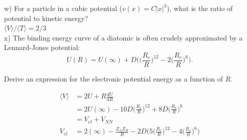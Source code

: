 \documentclass{article}
\begin{document}
\noindent w) For a particle in a cubic potential ($v(x) = C|x|^3$), what is the ratio
of potential to kinetic energy?
\\

{\color{blue} $\langle V\rangle/\langle T \rangle = 2/3$}
\\

\noindent x) The binding energy curve of a diatomic is often crudely approximated by a
Lennard-Jones potential:
\begin{equation*}
  U(R) = U(\infty) +D\Bigg(\Bigg(\frac{R_e}{R}\Bigg)^{12} - 2\Bigg(\frac{R_e}{R}\Bigg)^6\Bigg).
\end{equation*}

Derive an expression for the electronic potential energy as a function of $R$.

{\color{blue}
  \begin{align*}
    \langle V \rangle & = 2U + R\frac{dU}{dR} \\
    & = 2U(\infty) - 10D\Bigg(\frac{R_e}{R}\Bigg)^{12} + 8D\Bigg(\frac{R_e}{R}\Bigg)^6 \\
    & = V_{el} + V_{NN} \\
    V_{el} & = 2(\infty) -\frac{Z_AZ_B}{R} -2D\Bigg(5\Bigg(\frac{R_e}{R}\Bigg)^{12}-4\Bigg(\frac{R_e}{R}\Bigg)^6\Bigg)
  \end{align*}
}
\end{document}
